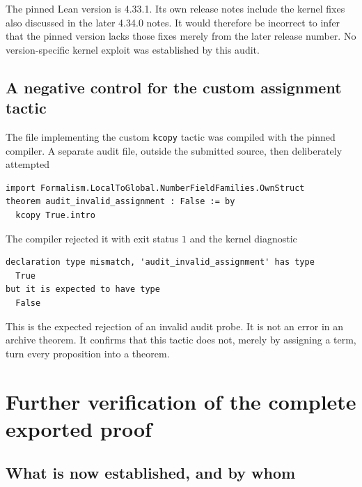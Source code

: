 \documentclass[11pt,a4paper]{article}
\theoremstyle{remark}
\newcommand{\src}[1]{\cite{#1}}
\newcommand{\code}[1]{\texttt{#1}}
\begin{document}
The pinned Lean version is 4.33.1. Its own release notes include the kernel fixes also discussed in the later 4.34.0 notes. It would therefore be incorrect to infer that the pinned version lacks those fixes merely from the later release number. No version-specific kernel exploit was established by this audit. \src{lean-release}

\subsection{A negative control for the custom assignment tactic}
The file implementing the custom \code{kcopy} tactic was compiled with the pinned compiler. A separate audit file, outside the submitted source, then deliberately attempted
\begin{verbatim}
import Formalism.LocalToGlobal.NumberFieldFamilies.OwnStruct
theorem audit_invalid_assignment : False := by
  kcopy True.intro
\end{verbatim}
\begin{minipage}{\linewidth}
The compiler rejected it with exit status $1$ and the kernel diagnostic
\begin{verbatim}
declaration type mismatch, 'audit_invalid_assignment' has type
  True
but it is expected to have type
  False
\end{verbatim}
\end{minipage}

This is the expected rejection of an invalid audit probe. It is not an error in an archive theorem. It confirms that this tactic does not, merely by assigning a term, turn every proposition into a theorem.

\section{Further verification of the complete exported proof}
\label{sec:complete-export-verification}

\subsection{What is now established, and by whom}
\end{document}
